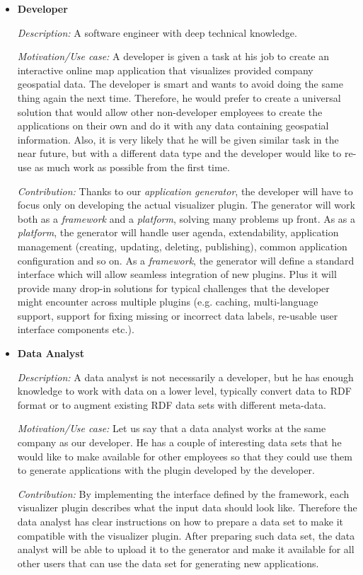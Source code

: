 \begin{itemize}
\item \textbf{Developer}

\textit{Description:} A software engineer with deep technical knowledge.

\textit{Motivation/Use case:} A developer is given a task at his job to create an interactive online map application that visualizes provided company geospatial data. The developer is smart and wants to avoid doing the same thing again the next time. Therefore, he would prefer to create a universal solution that would allow other non-developer employees to create the applications on their own and do it with any data containing geospatial information. Also, it is very likely that he will be given similar task in the near future, but with a different data type and the developer would like to re-use as much work as possible from the first time.

\textit{Contribution:} Thanks to our \emph{application generator}, the developer will have to focus only on developing the actual visualizer plugin. The generator will work both as a \textit{framework} and a \textit{platform}, solving many problems up front. As as a \textit{platform}, the generator will handle user agenda, extendability, application management (creating, updating, deleting, publishing), common application configuration and so on. As a \textit{framework}, the generator will define a standard  interface which will allow seamless integration of new plugins. Plus it will provide many drop-in solutions for typical challenges that the developer might encounter across multiple plugins (e.g. caching, multi-language support, support for fixing missing or incorrect data labels, re-usable user interface components etc.).

\item \textbf{Data Analyst}

\textit{Description:} A data analyst is not necessarily a developer, but he has enough knowledge to work with data on a lower level, typically convert data to RDF format or to augment existing RDF data sets with different meta-data. 

\textit{Motivation/Use case:} Let us say that a data analyst works at the same company as our developer. He has a couple of interesting data sets that he would like to make available for other employees so that they could use them to generate applications with the plugin developed by the developer.

\textit{Contribution:} By implementing the interface defined by the framework, each visualizer plugin describes what the input data should look like. Therefore the data analyst has clear instructions on how to prepare a data set to make it compatible with the visualizer plugin. After preparing such data set, the data analyst will be able to upload it to the generator and make it available for all other users that can use the data set for generating new applications.


\end{itemize}

